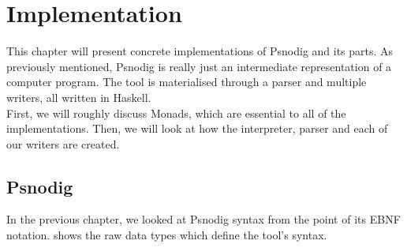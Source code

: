 \chapter{Implementation}

This chapter will present concrete implementations of Psnodig and its parts. As previously mentioned, Psnodig is really just an intermediate representation of a computer program. The tool is materialised through a parser and multiple writers, all written in Haskell. \\

First, we will roughly discuss Monads, which are essential to all of the implementations. Then, we will look at how the interpreter, parser and each of our writers are created. \\

\section{Psnodig}

In the previous chapter, we looked at Psnodig syntax from the point of its EBNF notation.  shows the raw data types which define the tool's syntax. \\

